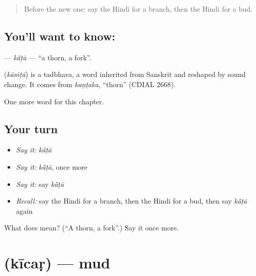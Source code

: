 \label{lesson:HI-C252-kata}



\begin{quote}
Before the new one: say the Hindi for a branch, then the Hindi for a bud.
\end{quote}

\subsection*{You'll want to know: }
\textbf{} — \emph{kā̃ṭā} — \textquotedblleft{}a thorn, a fork\textquotedblright{}.

\begin{cousinweb}
\textbf{} (\emph{kāṁṭā}) is a tadbhava, a word inherited from Sanskrit and reshaped by sound change. It comes from \emph{kaṇṭaka}, \textquotedblleft{}thorn\textquotedblright{} (CDIAL 2668).
\end{cousinweb}

\begin{grammarlens}[title={What you've built}]
One more word for this chapter.
\end{grammarlens}

\subsection*{Your turn}
\begin{itemize}
\raggedright
  \item \emph{Say it:} \emph{kā̃ṭā}
  \item \emph{Say it:} \emph{kā̃ṭā}, once more
  \item \emph{Say it:} say \emph{kā̃ṭā}
  \item \emph{Recall:} say the Hindi for a branch, then the Hindi for a bud, then say \emph{kā̃ṭā} again
\end{itemize}

\begin{tcolorbox}[breakable,colback=teal!4,colframe=teal!35!black,title={Before you move on}]
What does  mean? (\textquotedblleft{}A thorn, a fork\textquotedblright{}.) Say it once more.
\end{tcolorbox}
\section[\texorpdfstring{\hi{कीचड़} (kīcaṛ)}{कीचड़ (kīcaṛ)}]{ (kīcaṛ) — mud}

\label{lesson:HI-C252-kicar}



